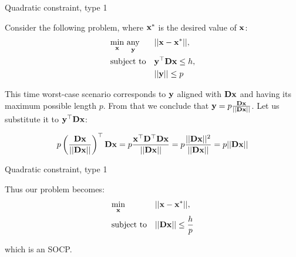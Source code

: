 \documentclass{beamer}
\begin{document}
\begin{frame}{Quadratic constraint, type 1}
\begin{flushleft}

Consider the following problem, where $\mathbf{x}^*$ is the desired value of $\mathbf{x}$:
%
\begin{equation}
\begin{aligned}
& \underset{\mathbf{x}}{\text{min}} \ \underset{\mathbf{y}}{\text{any}}
& & ||\mathbf{x} - \mathbf{x}^*||, \\
& \text{subject to}
& & \mathbf{y}^\top \mathbf{D} \mathbf{x} \leq h, \\
& & & ||\mathbf{y}|| \leq p
\end{aligned}
\end{equation}

This time worst-case scenario corresponds to $\mathbf{y}$ aligned with $\mathbf{D} \mathbf{x}$ and having its maximum possible length $p$. From that we conclude that $\mathbf{y} = p \frac{\mathbf{D} \mathbf{x}}{|| \mathbf{D} \mathbf{x} ||} $. Let us substitute it to $\mathbf{y}^\top \mathbf{D} \mathbf{x}$:

\begin{equation}
    p \left( \frac{\mathbf{D} \mathbf{x}}{|| \mathbf{D} \mathbf{x} ||} \right)^\top \mathbf{D} \mathbf{x} =
    p \frac{\mathbf{x}^\top \mathbf{D}^\top \mathbf{D} \mathbf{x}}{|| \mathbf{D} \mathbf{x} ||} = 
    p \frac{|| \mathbf{D} \mathbf{x} ||^2}{|| \mathbf{D} \mathbf{x} ||} = 
    p || \mathbf{D} \mathbf{x} ||
\end{equation}
 
\end{flushleft}
\end{frame}



\begin{frame}{Quadratic constraint, type 1}
\begin{flushleft}

Thus our problem becomes:
%
\begin{equation}
\begin{aligned}
& \underset{\mathbf{x}}{\text{min}}
& & ||\mathbf{x} - \mathbf{x}^*||, \\
& \text{subject to}
& & || \mathbf{D} \mathbf{x} || \leq \frac{h}{p}
\end{aligned}
\end{equation}

which is an SOCP.

\end{flushleft}
\end{frame}
\end{document}
